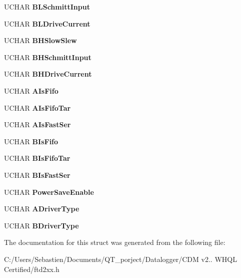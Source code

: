 \begin{DoxyCompactItemize}
U\+C\+H\+AR {\bfseries B\+L\+Schmitt\+Input}
\item 
\mbox{\label{structft__eeprom__2232h_a964876406798f7c704764488c04b1530}} 
U\+C\+H\+AR {\bfseries B\+L\+Drive\+Current}
\item 
\mbox{\label{structft__eeprom__2232h_ab371dbca25fb1d51359031c74cd6821b}} 
U\+C\+H\+AR {\bfseries B\+H\+Slow\+Slew}
\item 
\mbox{\label{structft__eeprom__2232h_a698ed4dae2f5efd99edcb349bc9d26dc}} 
U\+C\+H\+AR {\bfseries B\+H\+Schmitt\+Input}
\item 
\mbox{\label{structft__eeprom__2232h_a3a1abb3b2944000c21b54ce123913c5f}} 
U\+C\+H\+AR {\bfseries B\+H\+Drive\+Current}
\item 
\mbox{\label{structft__eeprom__2232h_a1f8310b3d7ee2c20328e1bdd812c0fa5}} 
U\+C\+H\+AR {\bfseries A\+Is\+Fifo}
\item 
\mbox{\label{structft__eeprom__2232h_a497cfb3ec327a899ea4a8904a355abba}} 
U\+C\+H\+AR {\bfseries A\+Is\+Fifo\+Tar}
\item 
\mbox{\label{structft__eeprom__2232h_a0d84c7ea097453ff9d222c12ffc145f8}} 
U\+C\+H\+AR {\bfseries A\+Is\+Fast\+Ser}
\item 
\mbox{\label{structft__eeprom__2232h_a967db8f183ffb34000282afa58f5fd0a}} 
U\+C\+H\+AR {\bfseries B\+Is\+Fifo}
\item 
\mbox{\label{structft__eeprom__2232h_a88d403ec9e1b8bdb88160fd3b3129191}} 
U\+C\+H\+AR {\bfseries B\+Is\+Fifo\+Tar}
\item 
\mbox{\label{structft__eeprom__2232h_a1e713eb322844d1d45e0439087571133}} 
U\+C\+H\+AR {\bfseries B\+Is\+Fast\+Ser}
\item 
\mbox{\label{structft__eeprom__2232h_a411dc2831f568c59e7e7eed513254f94}} 
U\+C\+H\+AR {\bfseries Power\+Save\+Enable}
\item 
\mbox{\label{structft__eeprom__2232h_af3f3a2c5c9aaa729219e0139cdfb9510}} 
U\+C\+H\+AR {\bfseries A\+Driver\+Type}
\item 
\mbox{\label{structft__eeprom__2232h_a9a4775d141f2b01fc4d846cb3cd23368}} 
U\+C\+H\+AR {\bfseries B\+Driver\+Type}
\end{DoxyCompactItemize}


The documentation for this struct was generated from the following file\+:\begin{DoxyCompactItemize}
\item 
C\+:/\+Users/\+Sebastien/\+Documents/\+Q\+T\+\_\+porject/\+Datalogger/\+C\+D\+M v2.. W\+H\+Q\+L Certified/ftd2xx.\+h\end{DoxyCompactItemize}
